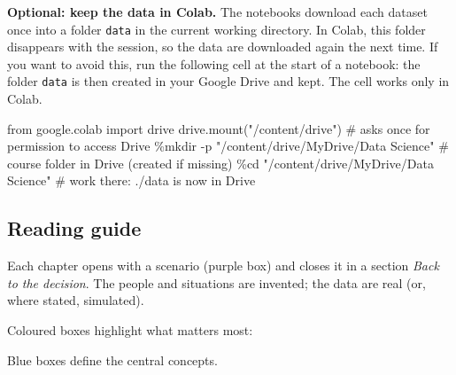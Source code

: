 \documentclass[
  letterpaper,
  DIV=11,
  numbers=noendperiod]{scrreprt}
\newenvironment{Shaded}{\begin{snugshade}}{\end{snugshade}}
\newcommand{\CommentTok}[1]{\textcolor[rgb]{0.37,0.37,0.37}{#1}}
\newcommand{\ImportTok}[1]{\textcolor[rgb]{0.00,0.46,0.62}{#1}}
\newcommand{\NormalTok}[1]{\textcolor[rgb]{0.00,0.23,0.31}{#1}}
\newcommand{\OperatorTok}[1]{\textcolor[rgb]{0.37,0.37,0.37}{#1}}
\newcommand{\StringTok}[1]{\textcolor[rgb]{0.13,0.47,0.30}{#1}}
\begin{document}
\textbf{Optional: keep the data in Colab.} The notebooks download each
dataset once into a folder \texttt{data} in the current working
directory. In Colab, this folder disappears with the session, so the
data are downloaded again the next time. If you want to avoid this, run
the following cell at the start of a notebook: the folder \texttt{data}
is then created in your Google Drive and kept. The cell works only in
Colab.

\begin{Shaded}
\begin{Highlighting}[]
\ImportTok{from}\NormalTok{ google.colab }\ImportTok{import}\NormalTok{ drive}
\NormalTok{drive.mount(}\StringTok{"/content/drive"}\NormalTok{)                        }\CommentTok{\# asks once for permission to access Drive}
\OperatorTok{\%}\NormalTok{mkdir }\OperatorTok{{-}}\NormalTok{p }\StringTok{"/content/drive/MyDrive/Data Science"}      \CommentTok{\# course folder in Drive (created if missing)}
\OperatorTok{\%}\NormalTok{cd }\StringTok{"/content/drive/MyDrive/Data Science"}            \CommentTok{\# work there: ./data is now in Drive}
\end{Highlighting}
\end{Shaded}

\subsection*{Reading guide}\label{reading-guide}

Each chapter opens with a scenario (purple box) and closes it in a
section \emph{Back to the decision}. The people and situations are
invented; the data are real (or, where stated, simulated).

Coloured boxes highlight what matters most:

\begin{tcolorbox}[enhanced jigsaw, left=2mm, title=\textcolor{quarto-callout-note-color}{\faInfo}\hspace{0.5em}{Definitions}, opacityback=0, breakable, rightrule=.15mm, arc=.35mm, toptitle=1mm, colbacktitle=quarto-callout-note-color!10!white, opacitybacktitle=0.6, coltitle=black, colframe=quarto-callout-note-color-frame, bottomrule=.15mm, leftrule=.75mm, bottomtitle=1mm, titlerule=0mm, toprule=.15mm, colback=white]

Blue boxes define the central concepts.

\end{tcolorbox}
\end{document}
